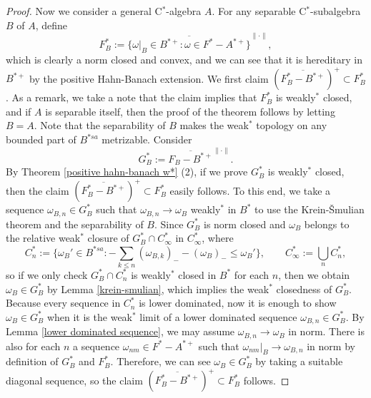 \documentclass[a4paper]{amsart}
\theoremstyle{plain}
\theoremstyle{definition}
\begin{document}
\begin{proof}
Now we consider a general C$^*$-algebra $A$.
For any separable C$^*$-subalgebra $B$ of $A$, define
\[F_B^*:=\overline{\{\omega|_B\in B^{*+}:\omega\in F^*-A^{*+}\}}^{\|\cdot\|},\]
which is clearly a norm closed and convex, and we can see that it is hereditary in $B^{*+}$ by the positive Hahn-Banach extension.
We first claim $(\overline{F_B^*-B^{*+}})^+\subset F_B^*$.
As a remark, we take a note that the claim implies that $F_B^*$ is weakly$^*$ closed, and if $A$ is separable itself, then the proof of the theorem follows by letting $B=A$.
Note that the separability of $B$ makes the weak$^*$ topology on any bounded part of $B^{*sa}$ metrizable.
Consider
\[G_B^*:=\overline{F_B-B^{*+}}^{\|\cdot\|}.\]
By Theorem \ref{positive hahn-banach w*} (2), if we prove $G_B^*$ is weakly$^*$ closed, then the claim $(\overline{F_B^*-B^{*+}})^+\subset F_B^*$ easily follows.
To this end, we take a sequence $\omega_{B,n}\in G_B^*$ such that $\omega_{B,n}\to\omega_B$ weakly$^*$ in $B^*$ to use the Krein-\v Smulian theorem and the separability of $B$.
Since $G_B^*$ is norm closed and $\omega_B$ belongs to the relative weak$^*$ closure of $G_B^*\cap C_\infty^*$ in $C_\infty^*$, where
\[C_n^*:=\{\omega_B'\in B^{*sa}:-\sum_{k\le n}(\omega_{B,k})_--(\omega_B)_-\le\omega_B'\},\qquad C_\infty^*:=\bigcup_nC_n^*,\]
so if we only check $G^*_B\cap C_n^*$ is weakly$^*$ closed in $B^*$ for each $n$, then we obtain $\omega_B\in G^*_B$ by Lemma \ref{krein-smulian}, which implies the weak$^*$ closedness of $G_B^*$.
Because every sequence in $C_n^*$ is lower dominated, now it is enough to show $\omega_B\in G_B^*$ when it is the weak$^*$ limit of a lower dominated sequence $\omega_{B,n}\in G_B^*$.
By Lemma \ref{lower dominated sequence}, we may assume $\omega_{B,n}\to\omega_B$ in norm.
There is also for each $n$ a sequence $\omega_{nm}\in F^*-A^{*+}$ such that $\omega_{nm}|_B\to\omega_{B,n}$ in norm by definition of $G_B^*$ and $F_B^*$.
Therefore, we can see $\omega_B\in G_B^*$ by taking a suitable diagonal sequence, so the claim $(\overline{F_B^*-B^{*+}})^+\subset F_B^*$ follows.


\end{proof}
\end{document}
